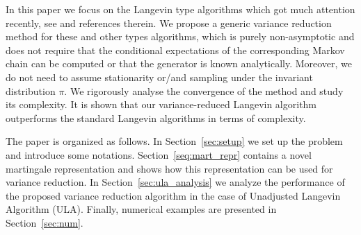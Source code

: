 \documentclass[bj]{imsart}
\begin{document}
\par
In this paper we focus on the  Langevin type algorithms which got much attention recently, see \cite{dalalyan2017theoretical,durmus:moulines:2017, MR2353037, MR3861816, MR2977986} and references therein. We propose  a generic variance reduction method for these and other types algorithms, which is purely non-asymptotic and does not require that    the conditional expectations of the corresponding Markov chain can be computed  or that the generator is known analytically. Moreover, we do not need to assume stationarity or/and sampling under the invariant distribution \(\pi.\) We rigorously analyse the convergence of the method and study its complexity. It is shown that  our variance-reduced Langevin algorithm outperforms the standard Langevin algorithms in terms of complexity.
\par
The paper is organized as follows.  In Section~\ref{sec:setup} we set up the problem and introduce some notations. Section~\ref{seq:mart_repr} contains a novel martingale representation and shows how this representation can be used for variance reduction. In Section~\ref{sec:ula_analysis} we analyze the performance of the proposed variance reduction algorithm in the case of Unadjusted Langevin Algorithm (ULA).  Finally, numerical examples are presented in Section~\ref{sec:num}.
\end{document}
